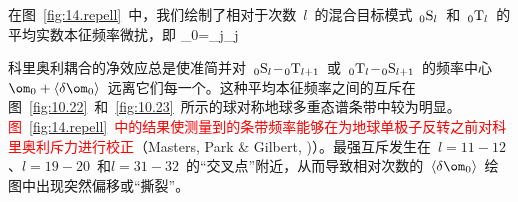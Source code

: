 在图~\ref{fig:14.repell}~中，我们绘制了相对于次数~$l$~的混合目标模式~${}_0{\rm S}_l$~和~${}_0{\rm T}_l$~的平均实数本征频率微扰，即
%
%
\eq \label{14.shiftdef}
\langle\delta\om_0\rangle=\sum_j\delta\om_j
\en

科里奥利耦合的净效应总是使准简并对~${}_0{\rm S}_{l}\!-\!{}_0{\rm T}_{l+1}$~或~${}_0{\rm T}_{l}\!-\!{}_0{\rm S}_{l+1}$~的频率中心~$\om_0+\langle\delta\om_0\rangle$~远离它们每一个。这种平均本征频率之间的互斥在图~\ref{fig:10.22}~和~\ref{fig:10.23}~所示的球对称地球多重态谱条带中较为明显。\textcolor{red}{图~\ref{fig:14.repell}~中的结果使测量到的条带频率能够在为地球单极子反转之前对科里奥利斥力进行校正}（Masters, Park \& Gilbert, \citeyear{masters&al83})）。最强互斥发生在~$l=11\!-\!12$、$l=19\!-\!20$~和$l=31\!-\!32$~的“交叉点”附近，从而导致相对次数的~$\langle\delta\om_0\rangle$~绘图中出现突然偏移或“撕裂”。

